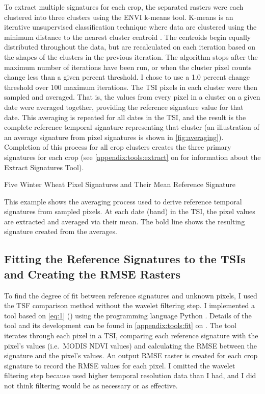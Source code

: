 To extract multiple signatures for each crop, the separated rasters were each clustered into three clusters using the ENVI \autocite{envi5.0} k-means tool. K-means is an iterative unsupervised classification technique where data are clustered using the minimum distance to the nearest cluster centroid \autocites{kmeans2014}{matteucciclustering:}. The centroids begin equally distributed throughout the data, but are recalculated on each iteration based on the shapes of the clusters in the previous iteration. The algorithm stops after the maximum number of iterations have been run, or when the cluster pixel counts change less than a given percent threshold. I chose to use a 1.0 percent change threshold over 100 maximum iterations. The TSI pixels in each cluster were then sampled and averaged. That is, the values from every pixel in a cluster on a given date were averaged together, providing the reference signature value for that date. This averaging is repeated for all dates in the TSI, and the result is the complete reference temporal signature representing that cluster (an illustration of an average signature from pixel signatures is shown in \autoref{fig:averaging}). Completion of this process for all crop clusters creates the three primary signatures for each crop (see \autoref{appendix:tools:extract} on  for information about the Extract Signatures Tool).

\begin{ssfigure}
  \centering
  
  \caption{Five Winter Wheat Pixel Signatures and Their Mean Reference Signature}
  \label{fig:averaging}
  \medskip
  \small
  This example shows the averaging process used to derive reference temporal signatures from sampled pixels. At each date (band) in the TSI, the pixel values are extracted and averaged via their mean. The bold line shows the resulting signature created from the averages.
\end{ssfigure}


\subsection{Fitting the Reference Signatures to the TSIs and Creating the RMSE Rasters}

To find the degree of fit between reference signatures and unknown pixels, I used the TSF comparison method without the wavelet filtering step. I implemented a tool based on \autoref{eq:1} () using the programming language Python \autocite{python2.7.8}. Details of the tool and its development can be found in \autoref{appendix:tools:fit} on . The tool iterates through each pixel in a TSI, comparing each reference signature with the pixel's values (i.e.\ MODIS NDVI values) and calculating the RMSE between the signature and the pixel's values. An output RMSE raster is created for each crop signature to record the RMSE values for each pixel. I omitted the wavelet filtering step because \citeauthor{sakamoto2010a-two-step} used higher temporal resolution data than I had, and I did not think filtering would be as necessary or as effective.

